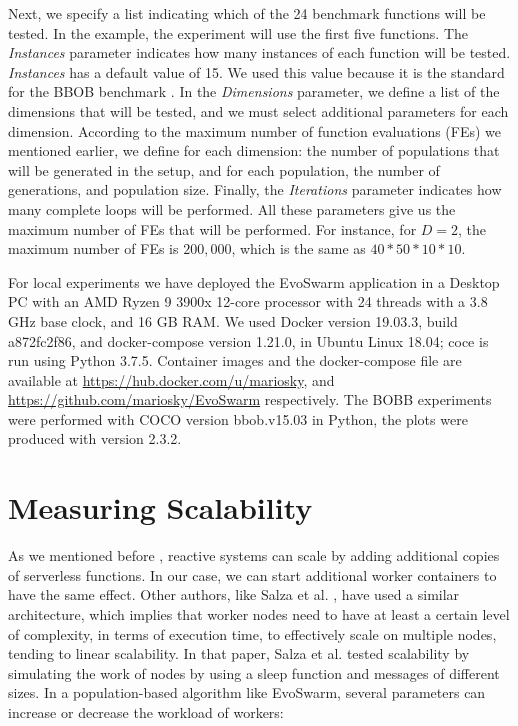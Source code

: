 \documentclass[review]{elsarticle}
\begin{document}
Next, we specify a list indicating which of the 24 benchmark
functions will be tested. In the example, the experiment will use the first five
functions.  The {\em Instances} parameter indicates how many instances of each
function will be tested. {\em Instances}  has a default value of 15. We used this
value because it is the standard for the BBOB benchmark \cite{hansen2016coco}.
In the {\em Dimensions} parameter, we define a list of the dimensions that will
be tested, and we must select additional parameters for each dimension.
According to the maximum number of function evaluations (FEs) we mentioned
earlier, we define for each dimension: the number of populations that will be
generated in the setup, and for each population,  the number of generations, and
population size. Finally, the {\em Iterations} parameter indicates how many
complete loops will be performed. All these parameters give us the maximum
number of FEs that will be performed. For instance, for $D = 2$, the maximum
number of FEs is $200,000$, which is the same as $40*50*10*10$.

For local experiments we have deployed the EvoSwarm application in a
Desktop PC with an AMD Ryzen 9 3900x 12-core processor with 24 threads with a 3.8 GHz base clock, 
and 16 GB RAM. We used Docker version 19.03.3, build a872fc2f86, and docker-compose version 1.21.0, 
in Ubuntu Linux 18.04; coce is run using Python 3.7.5. Container images and the docker-compose file are available at
\url{https://hub.docker.com/u/mariosky}, and \url{https://github.com/mariosky/EvoSwarm} respectively. 
The BOBB experiments were performed with COCO \cite{hansen2016coco} version bbob.v15.03 in Python, 
the plots were produced with version 2.3.2. %

\section{Measuring Scalability}
\label{sec:exp1}
As we mentioned before %
, reactive systems can scale by adding additional copies
of serverless functions. In our case, we can start additional worker containers
to have the same effect. Other authors, like Salza et al. \cite{salza2019speed},
have used a
similar architecture, which implies that worker nodes need to have at least a certain level
of complexity, in terms of execution time,  to effectively scale on multiple
nodes, tending to linear scalability. In that paper, Salza et al. tested scalability
by simulating the work of nodes by using a sleep function and messages of different sizes.
In a population-based algorithm like EvoSwarm, several parameters can increase or 
decrease the workload of workers:
\end{document}
